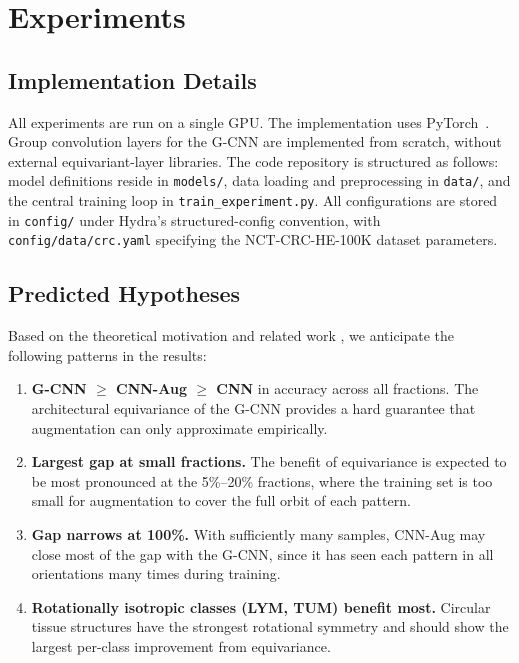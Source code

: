 \section{Experiments}
\label{sec:experiments}

\subsection{Implementation Details}

All experiments are run on a single GPU. The implementation uses
PyTorch~\citep{paszke2019pytorch}. Group convolution layers for the G-CNN are
implemented from scratch, without external equivariant-layer libraries.
The code repository is structured as follows: model definitions reside in
\texttt{models/}, data loading and preprocessing in \texttt{data/}, and the central
training loop in \texttt{train\_experiment.py}. All configurations are stored in
\texttt{config/} under Hydra's structured-config convention, with
\texttt{config/data/crc.yaml} specifying the NCT-CRC-HE-100K dataset parameters.

\subsection{Predicted Hypotheses}

Based on the theoretical motivation and related work \citep{veeling2018rotation}, we
anticipate the following patterns in the results:

\begin{enumerate}
  \item \textbf{G-CNN \(\geq\) CNN-Aug \(\geq\) CNN} in accuracy across all fractions.
    The architectural equivariance of the G-CNN provides a hard guarantee that
    augmentation can only approximate empirically.
  \item \textbf{Largest gap at small fractions.} The benefit of equivariance is
    expected to be most pronounced at the 5\%--20\% fractions, where the training
    set is too small for augmentation to cover the full orbit of each pattern.
  \item \textbf{Gap narrows at 100\%.} With sufficiently many samples, CNN-Aug may
    close most of the gap with the G-CNN, since it has seen each pattern in all
    orientations many times during training.
  \item \textbf{Rotationally isotropic classes (LYM, TUM) benefit most.}
    Circular tissue structures have the strongest rotational symmetry and should
    show the largest per-class improvement from equivariance.
\end{enumerate}

